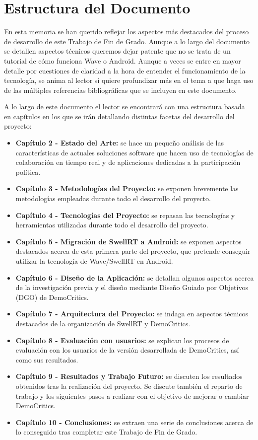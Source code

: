 \section{Estructura del Documento}

En esta memoria se han querido reflejar los aspectos más destacados del proceso de desarrollo de este Trabajo de Fin de Grado. Aunque a lo largo del documento se detallen aspectos técnicos queremos dejar patente que no se trata de un tutorial de cómo funciona Wave o Android. Aunque a veces se entre en mayor detalle por cuestiones de claridad a la hora de entender el funcionamiento de la tecnología, se anima al lector si quiere profundizar más en el tema a que haga uso de las múltiples referencias bibliográficas que se incluyen en este documento.  

A lo largo de este documento el lector se encontrará con una estructura basada en capítulos en los que se irán detallando distintas facetas del desarrollo del proyecto: 

\begin{itemize}
  \item \textbf{Capítulo 2 - Estado del Arte:} se hace un pequeño análisis de las características de actuales soluciones software que hacen uso de tecnologías de colaboración en tiempo real y de aplicaciones dedicadas a la participación política.
  \item \textbf{Capítulo 3 - Metodologías del Proyecto:} se exponen brevemente las metodologías empleadas durante todo el desarrollo del proyecto.
  \item \textbf{Capítulo 4 - Tecnologías del Proyecto:} se repasan las tecnologías y herramientas utilizadas durante todo el desarrollo del proyecto.
  \item \textbf{Capítulo 5 - Migración de SwellRT a Android:} se exponen aspectos destacados acerca de esta primera parte del proyecto, que pretende conseguir utilizar la tecnología de Wave/SwellRT en Android.
    \item \textbf{Capítulo 6 - Diseño de la Aplicación:} se detallan algunos aspectos acerca de la investigación previa y el diseño mediante Diseño Guiado por Objetivos (DGO) de DemoCritics.
  \item \textbf{Capítulo 7 - Arquitectura del Proyecto:} se indaga en aspectos técnicos destacados de la organización de SwellRT y DemoCritics.
    \item \textbf{Capítulo 8 - Evaluación con usuarios:} se explican los procesos de evaluación con los usuarios de la versión desarrollada de DemoCritics, así como sus resultados.
  \item \textbf{Capítulo 9 - Resultados y Trabajo Futuro:} se discuten los resultados obtenidos tras la realización del proyecto. Se discute también el reparto de trabajo y los siguientes pasos a realizar con el objetivo  de mejorar o cambiar DemoCritics.
    \item \textbf{Capítulo 10 - Conclusiones:} se extraen una serie de conclusiones acerca de lo conseguido tras completar este Trabajo de Fin de Grado.
\end{itemize}
